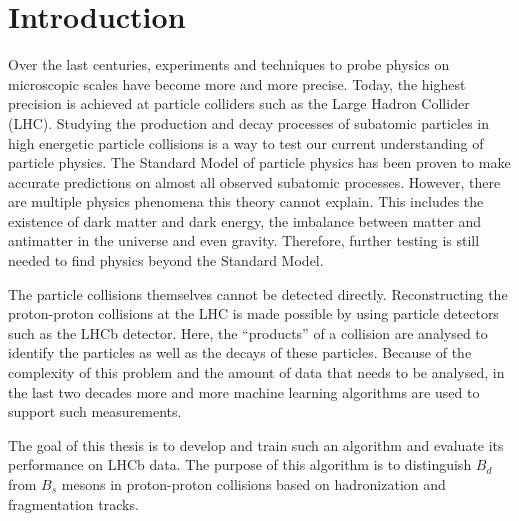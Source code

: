 \chapter{Introduction}

Over the last centuries, experiments and techniques to probe physics on microscopic scales have become more and more precise.
Today, the highest precision is achieved at particle colliders such as the Large Hadron Collider (LHC).
Studying the production and decay processes of subatomic particles in high energetic particle collisions is a way to test our current understanding of particle physics.
The Standard Model of particle physics has been proven to make accurate predictions on almost all observed subatomic processes.
However, there are multiple physics phenomena this theory cannot explain.
This includes the existence of dark matter and dark energy, the imbalance between matter and antimatter in the universe and even gravity.
Therefore, further testing is still needed to find physics beyond the Standard Model.

The particle collisions themselves cannot be detected directly.
Reconstructing the proton-proton collisions at the LHC is made possible by using particle detectors such as the LHCb detector.
Here, the \enquote{products} of a collision are analysed to identify the particles as well as the decays of these particles.
Because of the complexity of this problem and the amount of data that needs to be analysed, in the last two decades more and more machine learning algorithms are used to support such measurements.

The goal of this thesis is to develop and train such an algorithm and evaluate its performance on LHCb data.
The purpose of this algorithm is to distinguish $B_d$ from $B_s$ mesons in proton-proton collisions based on hadronization and fragmentation tracks. 




















